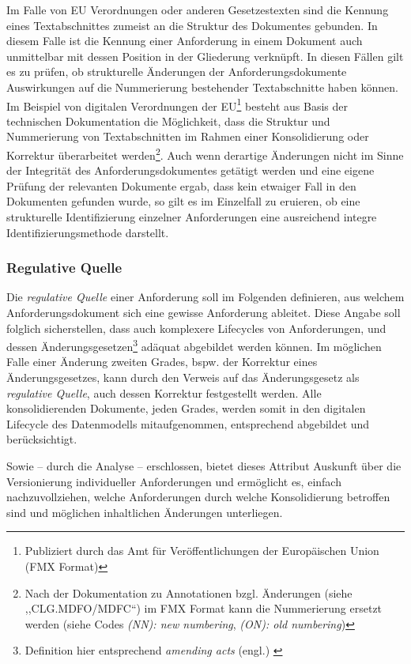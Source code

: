     \medskip
    Im Falle von \acs{EU} Verordnungen oder anderen Gesetzestexten sind die Kennung eines Textabschnittes zumeist an die Struktur des Dokumentes gebunden. 
    In diesem Falle ist die Kennung einer Anforderung in einem Dokument auch unmittelbar mit dessen Position in der Gliederung verknüpft. 
    In diesen Fällen gilt es zu prüfen, ob strukturelle Änderungen der Anforderungsdokumente Auswirkungen auf die Nummerierung bestehender Textabschnitte haben können.
    Im Beispiel von digitalen Verordnungen der EU\footnote{Publiziert durch das Amt für Veröffentlichungen der Europäischen Union (FMX Format)} besteht aus Basis der technischen Dokumentation die Möglichkeit, dass die Struktur und Nummerierung von Textabschnitten im Rahmen einer Konsolidierung oder Korrektur überarbeitet werden\footnote{Nach der Dokumentation zu Annotationen bzgl. Änderungen (siehe ,,CLG.MDFO/MDFC``) im FMX Format kann die Nummerierung ersetzt werden (siehe Codes \textit{(NN): new numbering}, \textit{(ON): old numbering})\cite[vgl S. 76-79]{eu_fmx4_proc}}. 
    Auch wenn derartige Änderungen nicht im Sinne der Integrität des Anforderungsdokumentes getätigt werden und eine eigene Prüfung der relevanten Dokumente ergab, dass kein etwaiger Fall in den Dokumenten gefunden wurde, so gilt es im Einzelfall zu eruieren, ob eine strukturelle Identifizierung einzelner Anforderungen eine ausreichend integre Identifizierungsmethode darstellt. 

\subsubsection{Regulative Quelle}
    
    Die \textit{regulative Quelle} einer Anforderung soll im Folgenden definieren, aus welchem Anforderungsdokument sich eine gewisse Anforderung ableitet. 
    Diese Angabe soll folglich sicherstellen, dass auch komplexere Lifecycles von Anforderungen, und dessen Änderungsgesetzen\footnote{Definition hier entsprechend  \textit{amending acts} (engl.) \cite{eu_consolidation}} adäquat abgebildet werden können.
    Im möglichen Falle einer Änderung zweiten Grades, bspw. der Korrektur eines Änderungsgesetzes, kann durch den Verweis auf das Änderungsgesetz als \textit{regulative Quelle}, auch dessen Korrektur festgestellt werden. 
    Alle konsolidierenden Dokumente, jeden Grades, werden somit in den digitalen Lifecycle des Datenmodells mitaufgenommen, entsprechend abgebildet und berücksichtigt.  

    \medskip
    Sowie -- durch die Analyse -- erschlossen, bietet dieses Attribut Auskunft über die Versionierung individueller Anforderungen und ermöglicht es, einfach nachzuvollziehen, welche Anforderungen durch welche Konsolidierung betroffen sind und möglichen inhaltlichen Änderungen unterliegen.
    
